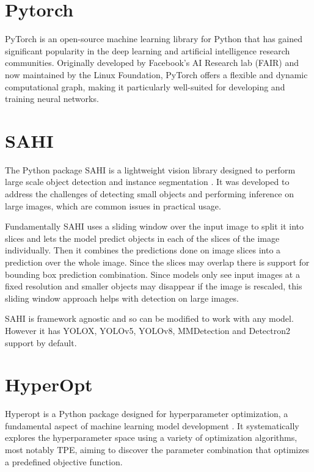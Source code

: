 \documentclass[10pt]{book}
\begin{document}
\section{Pytorch}

PyTorch is an open-source machine learning library for Python that has gained significant popularity in the deep learning and artificial intelligence research communities. Originally developed by Facebook's AI Research lab (FAIR) and now maintained by the Linux Foundation, PyTorch offers a flexible and dynamic computational graph, making it particularly well-suited for developing and training neural networks.

\section{SAHI}

The Python package \ac{SAHI} is a lightweight vision library designed to perform large scale object detection and instance segmentation \cite{akyon2022sahi,obss2021sahi}. It was developed to address the challenges of detecting small objects and performing inference on large images, which are common issues in practical usage. 

Fundamentally \ac{SAHI} uses a sliding window over the input image to split it into slices and lets the model predict objects in each of the slices of the image individually. Then it combines the predictions done on image slices into a prediction over the whole image. Since the slices may overlap there is support for bounding box prediction combination. Since models only see input images at a fixed resolution and smaller objects may disappear if the image is rescaled, this sliding window approach helps with detection on large images. 

\ac{SAHI} is framework agnostic and so can be modified to work with any model. However it has YOLOX, YOLOv5, YOLOv8, MMDetection and Detectron2 support by default.

\section{HyperOpt}

Hyperopt is a Python package designed for hyperparameter optimization, a fundamental aspect of machine learning model development \cite{bergstra2013making}. It systematically explores the hyperparameter space using a variety of optimization algorithms, most notably \ac{TPE}, aiming to discover the parameter combination that optimizes a predefined objective function. 
\end{document}
